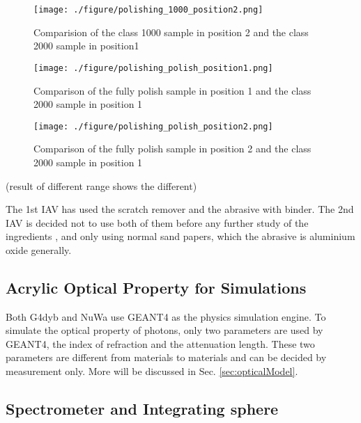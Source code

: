 \begin{figure}
    \centering
    \texttt{[image: ./figure/polishing\_1000\_position2.png]}
    \caption{Comparision of the class 1000 sample in position 2 and the class 2000 sample in position1}
    \label{polishing_1000_position2.png}
    \end{figure}

\begin{figure}
    \centering
    \texttt{[image: ./figure/polishing\_polish\_position1.png]}
    \caption{Comparison of the fully polish sample in position 1 and the class 2000 sample in position 1}
    \label{polishing_polish_position1.png}
    \end{figure}

\begin{figure}
    \centering
    \texttt{[image: ./figure/polishing\_polish\_position2.png]}
    \caption{Comparison of the fully polish sample in position 2 and the class 2000 sample in position 1}
    \label{polishing_polish_position2.png}
    \end{figure}


(result of different range shows the different)

The 1st IAV has used the scratch remover and the abrasive with binder. The 2nd
IAV is decided not to use both of them before any further study of the ingredients
, and only using normal sand papers, which the abrasive is aluminium oxide generally. 


\subsection {Acrylic Optical Property for Simulations}

Both G4dyb and NuWa use GEANT4 as the physics simulation engine.
To simulate the optical property of photons, only two parameters are used
by GEANT4, the index of refraction and the attenuation length. These two
parameters are different from materials to materials and can be decided
by measurement only.
More will be discussed in Sec. \ref{sec:opticalModel}.

\subsection {Spectrometer and Integrating sphere}


